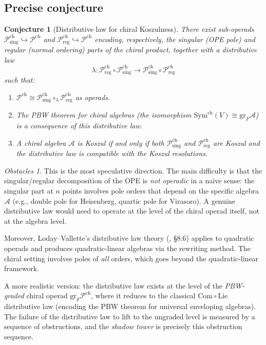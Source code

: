 \documentclass[11pt]{article}
\newtheorem{conjecture}{Conjecture}
\theoremstyle{definition}
\theoremstyle{remark}
\newtheorem*{obstacle}{Obstacles}
\newcommand{\Pch}{\mathcal{P}^{\mathrm{ch}}}
\newcommand{\cA}{\mathcal{A}}
\begin{document}
\subsection{Precise conjecture}

\begin{conjecture}[Distributive law for chiral Koszulness]
\label{conj:distributive-law}
There exist sub-operads
$\Pch_{\mathrm{sing}} \hookrightarrow \Pch$ and
$\Pch_{\mathrm{reg}} \hookrightarrow \Pch$
encoding, respectively, the singular (OPE pole) and regular (normal
ordering) parts of the chiral product, together with a distributive
law
\[
\lambda: \Pch_{\mathrm{reg}} \circ \Pch_{\mathrm{sing}}
\longrightarrow
\Pch_{\mathrm{sing}} \circ \Pch_{\mathrm{reg}}
\]
such that:
\begin{enumerate}
\item $\Pch \cong \Pch_{\mathrm{sing}} \circ_\lambda
  \Pch_{\mathrm{reg}}$ as operads.
\item The PBW theorem for chiral algebras
  (the isomorphism $\mathrm{Sym}^{\mathrm{ch}}(V) \cong
  \mathrm{gr}_F \cA$) is a consequence of this distributive law.
\item A chiral algebra $\cA$ is Koszul if and only if both
  $\Pch_{\mathrm{sing}}$ and $\Pch_{\mathrm{reg}}$ are Koszul and
  the distributive law is compatible with the Koszul resolutions.
\end{enumerate}
\end{conjecture}

\begin{obstacle}
This is the most speculative direction.  The main difficulty is
that the singular/regular decomposition of the OPE is
\emph{not operadic} in a naive sense: the singular part at $n$
points involves pole orders that depend on the specific algebra
$\cA$ (e.g., double pole for Heisenberg, quartic pole for
Virasoro).  A genuine distributive law would need to operate at the
level of the chiral operad itself, not at the algebra level.

Moreover, Loday--Vallette's distributive law theory
(\cite{LV12}, \S8.6) applies to quadratic operads and produces
quadratic-linear algebras via the rewriting method.  The chiral
setting involves poles of \emph{all} orders, which goes beyond the
quadratic-linear framework.

A more realistic version: the distributive law exists at the level
of the \emph{PBW-graded} chiral operad
$\mathrm{gr}_F \Pch$, where it reduces to the classical
$\mathrm{Com} \circ \mathrm{Lie}$ distributive law (encoding the
PBW theorem for universal enveloping algebras).  The failure of
the distributive law to lift to the ungraded level is measured by
a sequence of obstructions, and the \emph{shadow tower} is
precisely this obstruction sequence.
\end{obstacle}
\end{document}
